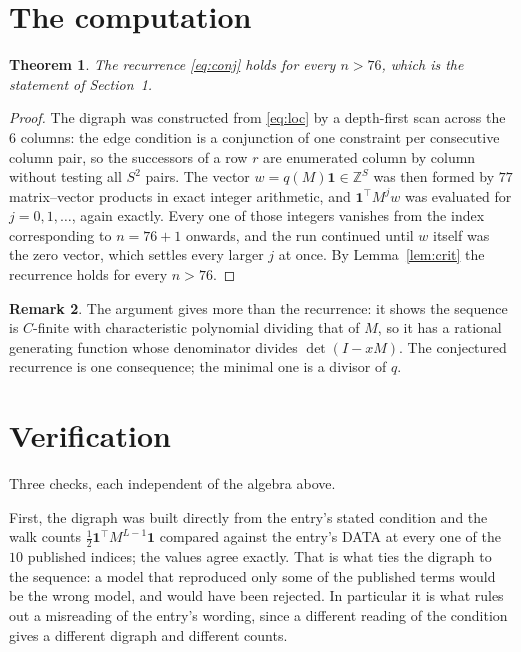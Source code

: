 \documentclass[11pt,a4paper]{article}
\theoremstyle{plain}
\newtheorem{theorem}{Theorem}
\theoremstyle{definition}
\newtheorem{remark}[theorem]{Remark}
\begin{document}
\section{The computation}

\begin{theorem}
The recurrence \eqref{eq:conj} holds for every $n>76$, which is the statement of
Section~1.
\end{theorem}

\begin{proof}
The digraph was constructed from \eqref{eq:loc} by a depth-first scan across the $6$
columns: the edge condition is a conjunction of one constraint per consecutive column
pair, so the successors of a row $r$ are enumerated column by column without testing all
$S^2$ pairs. The vector $w=q(M)\mathbf{1}\in\mathbb{Z}^{S}$ was then formed by $77$
matrix--vector products in exact integer arithmetic, and $\mathbf{1}^{\!\top}M^{j}w$ was
evaluated for $j=0,1,\dots$, again exactly. Every one of those integers vanishes from the
index corresponding to $n=76+1$ onwards, and the run continued until $w$ itself was the
zero vector, which settles every larger $j$ at once. By Lemma~\ref{lem:crit} the recurrence
holds for every $n>76$.
\end{proof}

\begin{remark}
The argument gives more than the recurrence: it shows the sequence is $C$-finite with
characteristic polynomial dividing that of $M$, so it has a rational generating function
whose denominator divides $\det(I-xM)$. The conjectured recurrence is one consequence; the
minimal one is a divisor of $q$.
\end{remark}

\section{Verification}

Three checks, each independent of the algebra above.

First, the digraph was built directly from the entry's stated condition and the walk counts
$\tfrac1{2}\mathbf{1}^{\!\top}M^{L-1}\mathbf{1}$ compared against the entry's DATA at
every one of the $10$ published indices; the values agree exactly. That is what ties
the digraph to the sequence: a model that reproduced only some of the published terms would
be the wrong model, and would have been rejected. In particular it is what rules out a
misreading of the entry's wording, since a different reading of the condition gives a
different digraph and different counts.
\end{document}
